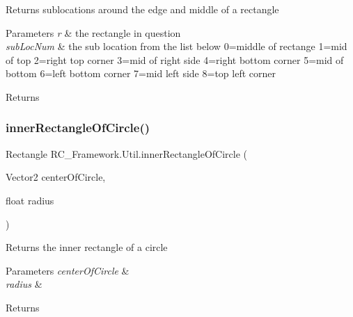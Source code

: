 Returns sublocations around the edge and middle of a rectangle 


\begin{DoxyParams}{Parameters}
{\em r} & the rectangle in question\\
\hline
{\em sub\+Loc\+Num} & the sub location from the list below 0=middle of rectange 1=mid of top 2=right top corner 3=mid of right side 4=right bottom corner 5=mid of bottom 6=left bottom corner 7=mid left side 8=top left corner \\
\hline
\end{DoxyParams}
\begin{DoxyReturn}{Returns}

\end{DoxyReturn}
\mbox{\label{class_r_c___framework_1_1_util_a4b3641d1c35bdd3428cb28da938b263b}} 
\subsubsection{\texorpdfstring{inner\+Rectangle\+Of\+Circle()}{innerRectangleOfCircle()}}
{\footnotesize\ttfamily Rectangle R\+C\+\_\+\+Framework.\+Util.\+inner\+Rectangle\+Of\+Circle (\begin{DoxyParamCaption}\item[{Vector2}]{center\+Of\+Circle,  }\item[{float}]{radius }\end{DoxyParamCaption})}



Returns the inner rectangle of a circle 


\begin{DoxyParams}{Parameters}
{\em center\+Of\+Circle} & \\
\hline
{\em radius} & \\
\hline
\end{DoxyParams}
\begin{DoxyReturn}{Returns}

\end{DoxyReturn}
\mbox{\label{class_r_c___framework_1_1_util_a286eafab09f04d0a65d82cc04315a606}} 
